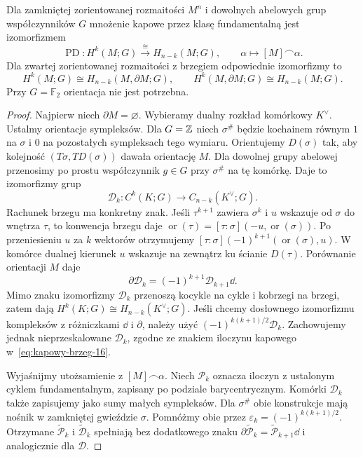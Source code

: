 \begin{twierdzenie}
\label{thm:poincare-dualnosc-16}
Dla zamkniętej zorientowanej
rozmaitości $M^n$ i dowolnych
abelowych grup współczynników $G$ mnożenie
kapowe przez klasę fundamentalną
jest izomorfizmem
\[
 \operatorname{PD}:H^k(M;G)
       \stackrel{\cong}{\longrightarrow}
       H_{n-k}(M;G),\qquad
 \alpha\longmapsto[M]\frown\alpha.
\]
Dla zwartej zorientowanej
rozmaitości z brzegiem
odpowiednie izomorfizmy to
\[
 H^k(M;G)\cong H_{n-k}(M,\partial M;G),
 \qquad
 H^k(M,\partial M;G)\cong H_{n-k}(M;G).
\]
Przy $G=\mathbb F_2$ orientacja
nie jest potrzebna.
\end{twierdzenie}
\begin{proof}
Najpierw niech $\partial M=\varnothing$.
Wybieramy dualny rozkład komórkowy
$K^\vee$. Ustalmy orientacje sympleksów. Dla $G=\mathbb{Z}$ niech
$\sigma^\#$ będzie kochainem równym $1$ na $\sigma$
i $0$ na pozostałych sympleksach tego wymiaru.
Orientujemy $D(\sigma)$ tak, aby kolejność
$(T\sigma,TD(\sigma))$ dawała orientację $M$.
Dla dowolnej grupy abelowej przenosimy po prostu
współczynnik $g\in G$ przy $\sigma^\#$ na tę komórkę.
Daje to izomorfizmy grup
\[
 \mathcal D_k:C^k(K;G)\longrightarrow C_{n-k}(K^\vee;G).
\]
Rachunek brzegu ma konkretny znak. Jeśli $\tau^{k+1}$
zawiera $\sigma^k$ i $u$ wskazuje od $\sigma$ do wnętrza
$\tau$, to konwencja brzegu daje
$\operatorname{or}(\tau)=[\tau:\sigma](-u,\operatorname{or}(\sigma))$.
Po przeniesieniu $u$ za $k$ wektorów otrzymujemy
$[\tau:\sigma](-1)^{k+1}(\operatorname{or}(\sigma),u)$.
W komórce dualnej kierunek $u$ wskazuje na zewnątrz
ku ścianie $D(\tau)$. Porównanie orientacji $M$ daje
\begin{equation}\label{eq:dualny-lancuch-16}
 \partial\mathcal D_k=(-1)^{k+1}\mathcal D_{k+1}\dd.
\end{equation}
Mimo znaku izomorfizmy $\mathcal D_k$ przenoszą
kocykle na cykle i kobrzegi na brzegi, zatem dają
$H^k(K;G)\cong H_{n-k}(K^\vee;G)$.
Jeśli chcemy dosłownego izomorfizmu kompleksów
z różniczkami $\dd$ i $\partial$, należy użyć
$(-1)^{k(k+1)/2}\mathcal D_k$. Zachowujemy jednak
nieprzeskalowane $\mathcal D_k$, zgodne ze znakiem
iloczynu kapowego w~\eqref{eq:kapowy-brzeg-16}.

Wyjaśnijmy utożsamienie z $[M]\frown\alpha$.
Niech $\mathcal P_k$ oznacza iloczyn z ustalonym
cyklem fundamentalnym, zapisany po podziale barycentrycznym.
Komórki $\mathcal D_k$ także zapisujemy jako sumy
małych sympleksów. Dla $\sigma^\#$ obie konstrukcje
mają nośnik w zamkniętej gwieździe $\sigma$.
Pomnóżmy obie przez $\varepsilon_k=(-1)^{k(k+1)/2}$.
Otrzymane $\widetilde{\mathcal P}_k$ i
$\widetilde{\mathcal D}_k$ spełniają bez dodatkowego znaku
$\partial\widetilde{\mathcal P}_k
=\widetilde{\mathcal P}_{k+1}\dd$ i analogicznie dla $\mathcal D$.


\end{proof}
